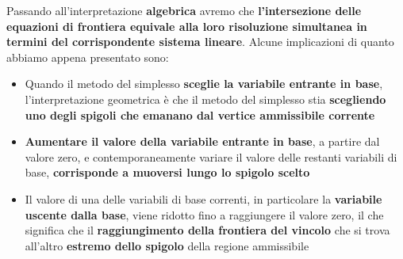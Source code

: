 \documentclass[12pt]{article}
\begin{document}
Passando all'interpretazione \textbf{algebrica} avremo che \textbf{l'intersezione delle equazioni di frontiera equivale alla loro risoluzione simultanea in termini del corrispondente sistema lineare}.
Alcune implicazioni di quanto abbiamo appena presentato sono:
\begin{itemize}
    \item Quando il metodo del simplesso \textbf{sceglie la variabile entrante in base}, l'interpretazione geometrica è che il metodo del simplesso stia \textbf{scegliendo uno degli spigoli che emanano dal vertice ammissibile corrente}
    \item \textbf{Aumentare il valore della variabile entrante in base}, a partire dal valore zero, e contemporaneamente variare il valore delle restanti variabili di base, \textbf{corrisponde a muoversi lungo lo spigolo scelto}
    \item Il valore di una delle variabili di base correnti, in particolare la \textbf{variabile uscente dalla base}, viene ridotto fino a raggiungere il valore zero, il che significa che il \textbf{raggiungimento della frontiera del vincolo} che si trova all'altro \textbf{estremo dello spigolo} della regione ammissibile
\end{itemize}
\end{document}
